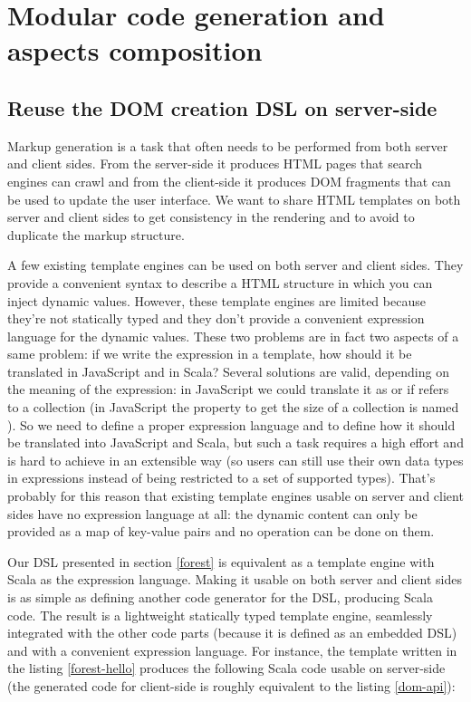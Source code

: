 \documentclass[american,english,runningheads]{llncs}
\begin{document}
\section{Modular code generation and aspects composition}
\label{lms-benefits}

\subsection{Reuse the DOM creation DSL on server-side}

Markup generation is a task that often needs to be performed from both server and client sides. From the server-side it produces HTML pages that search engines can crawl and from the client-side it produces DOM fragments that can be used to update the user interface. We want to share HTML templates on both server and client sides to get consistency in the rendering and to avoid to duplicate the markup structure.

A few existing template engines can be used on both server and client sides. They provide a convenient syntax to describe a HTML structure in which you can inject dynamic values. However, these template engines are limited because they’re not statically typed and they don’t provide a convenient expression language for the dynamic values. These two problems are in fact two aspects of a same problem: if we write the expression  in a template, how should it be translated in JavaScript and in Scala? Several solutions are valid, depending on the meaning of the expression: in JavaScript we could translate it as  or  if  refers to a collection (in JavaScript the property to get the size of a collection is named ). So we need to define a proper expression language and to define how it should be translated into JavaScript and Scala, but such a task requires a high effort and is hard to achieve in an extensible way (so users can still use their own data types in expressions instead of being restricted to a set of supported types). That’s probably for this reason that existing template engines usable on server and client sides have no expression language at all: the dynamic content can only be provided as a map of key-value pairs and no operation can be done on them.

Our DSL presented in section \ref{forest} is equivalent as a template engine with Scala as the expression language. Making it usable on both server and client sides is as simple as defining another code generator for the DSL, producing Scala code. The result is a lightweight statically typed template engine, seamlessly integrated with the other code parts (because it is defined as an embedded DSL) and with a convenient expression language. For instance, the template written in the listing \ref{forest-hello} produces the following Scala code usable on server-side (the generated code for client-side is roughly equivalent to the listing \ref{dom-api}):
\end{document}
